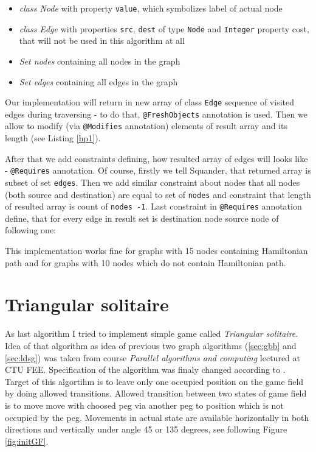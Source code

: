\documentclass[11pt,twoside,a4paper]{book}
\begin{document}
\begin{itemize}
  \item \textit{class Node} with property \verb|value|, which symbolizes label
  of actual node
  \item \textit{class Edge} with properties \verb|src|, \verb|dest| of type
  \verb|Node| and \verb|Integer| property cost, that will not be used in this
  algorithm at all
  \item \textit{Set nodes} containing all nodes in the graph
	\item \textit{Set edges} containing all edges in the graph
\end{itemize}

Our implementation will return in new array of class \verb|Edge| sequence of
visited edges during traversing - to do that, \verb|@FreshObjects| annotation is
used. Then we allow to modify (via \verb|@Modifies| annotation) elements of
result array and its length (see Listing \ref{hp1}).



After that we add constraints defining, how resulted array of edges will looks
like - \verb|@Requires| annotation. Of course, firstly we tell Squander, that
returned array is subset of set \verb|edges|. Then we add similar constraint about nodes that all nodes
(both source and destination) are equal to set of \verb|nodes| and constraint
that length of resulted array is count of \verb|nodes -1|. Last constraint in
\verb|@Requires| annotation define, that for every edge in result set is
destination node source node of following one:



This implementation works fine for graphs with 15 nodes containing Hamiltonian
path and for graphs with 10 nodes which do not contain Hamiltonian path.

\section{Triangular solitaire}
As last algorithm I tried to implement simple game called  \textit{Triangular
solitaire}. Idea of that algorithm as idea of previous two graph
algorithms (\ref{sec:gbb} and \ref{sec:ldsg}) was taken from course
\textit{Parallel algorithms and computing} lectured at CTU FEE. Specification of
the algorithm was finaly changed according to \cite{web:mathIsFun}. Target of
this algortihm is to leave only one occupied position on the game field by doing
allowed transitions. Allowed transition between two states of game field is to
move move with choosed peg via another peg to position which is not occupied by
the peg. Movements in actual state are available horizontally in both directions
and vertically under angle 45 or 135 degrees, see following Figure
\ref{fig:initGF}.
\end{document}
